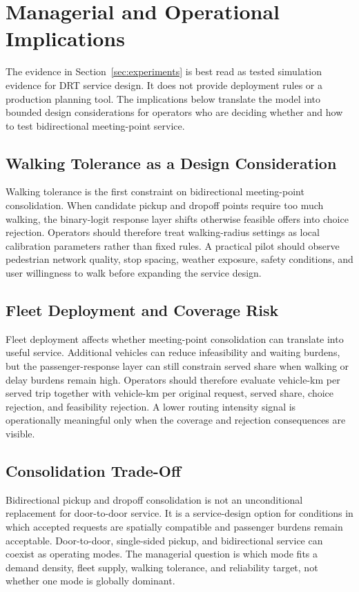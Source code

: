 \section{Managerial and Operational Implications}\label{sec:policy}

The evidence in Section~\ref{sec:experiments} is best read as tested simulation evidence
for DRT service design. It does not provide deployment rules or a production planning
tool. The implications below translate the model into bounded design considerations for
operators who are deciding whether and how to test bidirectional meeting-point service.

\subsection{Walking Tolerance as a Design Consideration}

Walking tolerance is the first constraint on bidirectional meeting-point consolidation.
When candidate pickup and dropoff points require too much walking, the binary-logit
response layer shifts otherwise feasible offers into choice rejection. Operators should
therefore treat walking-radius settings as local calibration parameters rather than
fixed rules. A practical pilot should observe pedestrian network quality, stop spacing,
weather exposure, safety conditions, and user willingness to walk before expanding the
service design.

\subsection{Fleet Deployment and Coverage Risk}

Fleet deployment affects whether meeting-point consolidation can translate into useful
service. Additional vehicles can reduce infeasibility and waiting burdens, but the
passenger-response layer can still constrain served share when walking or delay burdens
remain high. Operators should therefore evaluate vehicle-km per served trip together
with vehicle-km per original request, served share, choice rejection, and feasibility
rejection. A lower routing intensity signal is operationally meaningful only when the
coverage and rejection consequences are visible.

\subsection{Consolidation Trade-Off}

Bidirectional pickup and dropoff consolidation is not an unconditional replacement for
door-to-door service. It is a service-design option for conditions in which accepted
requests are spatially compatible and passenger burdens remain acceptable. Door-to-door,
single-sided pickup, and bidirectional service can coexist as operating modes. The
managerial question is which mode fits a demand density, fleet supply, walking tolerance,
and reliability target, not whether one mode is globally dominant.

